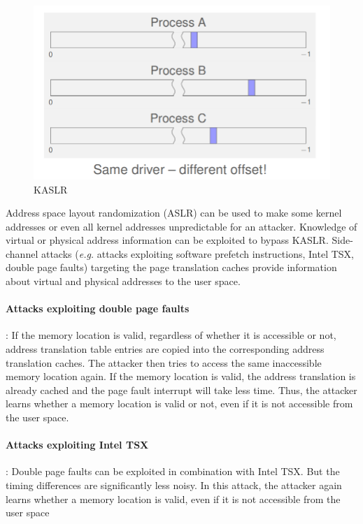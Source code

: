 \documentclass[runningheads]{llncs}
\begin{document}
\begin{figure}
\centerline{\includegraphics[scale=0.3]{images/kaslr.png}}
\caption{KASLR} \label{kaslr}
\end{figure}

Address space layout randomization (ASLR) can be used to make some kernel addresses or even all kernel addresses unpredictable for an attacker. Knowledge of virtual or physical address information can be exploited to bypass KASLR. Side-channel attacks (\textit{e.g.} attacks exploiting software prefetch instructions, Intel TSX, double page faults) targeting the page translation caches provide information about virtual and physical addresses to the user space.

\paragraph{Attacks exploiting double page faults}: If the memory location is valid, regardless of whether it is accessible or not, address translation table entries are copied into the corresponding address translation caches. The attacker then tries to access the same inaccessible memory location again. If the memory location is valid, the address translation is already cached and the page fault interrupt will take less time.  Thus, the attacker learns whether a memory location is valid or not, even if it is not accessible from the user space.

\paragraph{Attacks exploiting Intel TSX}: Double page faults can be exploited in combination with Intel TSX. But the timing differences are significantly less noisy. In this attack, the attacker again learns whether a memory location is valid, even if it is not accessible from the user space
\end{document}
